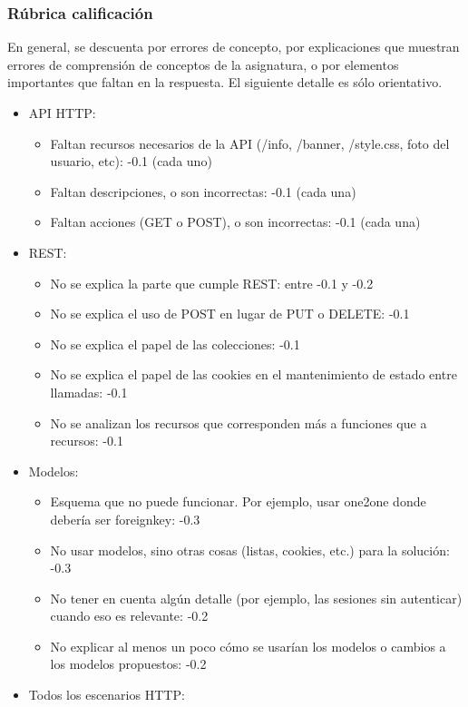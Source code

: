 \subsubsection{Rúbrica calificación}

En general, se descuenta por errores de concepto, por explicaciones que muestran errores de comprensión de conceptos de la asignatura, o por elementos importantes que faltan en la respuesta. El siguiente detalle es sólo orientativo.

\begin{itemize}
\item API HTTP:
  \begin{itemize}
  \item Faltan recursos necesarios de la API (/info, /banner, /style.css, foto del usuario, etc): -0.1 (cada uno)
  \item Faltan descripciones, o son incorrectas: -0.1 (cada una)
  \item Faltan acciones (GET o POST), o son incorrectas: -0.1 (cada una)
  \end{itemize}
\item REST:
  \begin{itemize}
  \item No se explica la parte que cumple REST: entre -0.1 y -0.2
  \item No se explica el uso de POST en lugar de PUT o DELETE: -0.1
  \item No se explica el papel de las colecciones: -0.1
  \item No se explica el papel de las cookies en el mantenimiento de estado entre llamadas: -0.1
  \item No se analizan los recursos que corresponden más a funciones que a recursos: -0.1
  \end{itemize}
\item Modelos:
  \begin{itemize}
  \item Esquema que no puede funcionar. Por ejemplo, usar one2one donde debería ser foreignkey: -0.3
  \item No usar modelos, sino otras cosas (listas, cookies, etc.) para la solución: -0.3
  \item No tener en cuenta algún detalle (por ejemplo, las sesiones sin autenticar) cuando eso es relevante: -0.2
  \item No explicar al menos un poco cómo se usarían los modelos o cambios a los modelos propuestos: -0.2
  \end{itemize}
\item Todos los escenarios HTTP:

\end{itemize}
